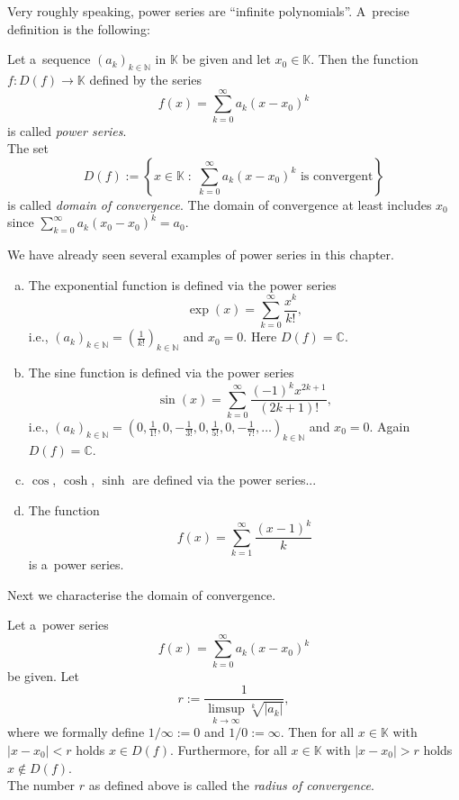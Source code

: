 

Very roughly speaking, power series are ``infinite polynomials''. A~precise definition is the following:
\begin{Definition}{}
Let a~sequence $(a_k)_{k\in\mathbb{N}}$ in $\mathbb{K}$ be given and let $x_0\in\mathbb{K}$. Then the function $f:D(f)\to\mathbb{K}$ defined by the series
\[f(x)=\sum_{k=0}^\infty a_k(x-x_0)^k\]
is called \emph{power series}.\\
The set
\[D(f):=\left\{x\in\mathbb{K}\;:\;\sum_{k=0}^\infty a_k(x-x_{0})^k\text{ is convergent}\right\}\]
is called \emph{domain of convergence}.  The domain of convergence at least includes $x_{0}$ since $\sum_{k=0}^\infty a_k(x_{0}-x_{0})^k=a_{0}$.
\end{Definition}
We have already seen several examples of power series in this chapter.
\begin{example}\label{ex:powser}
\begin{enumerate}[a)]
\item The exponential function is defined via the power series
\[\exp(x)=\sum_{k=0}^\infty\frac{x^k}{k!},\]
i.e., $(a_k)_{k\in\mathbb{N}}=(\frac{1}{k!})_{k\in\mathbb{N}}$ and $x_0=0$. Here $D(f)=\mathbb{C}$.
\item The sine function is defined via the power series
\[\sin(x)=\sum_{k=0}^\infty\frac{(-1)^kx^{2k+1}}{(2k+1)!},\]
i.e., $(a_k)_{k\in\mathbb{N}}=(0,\frac{1}{1!},0,-\frac{1}{3!},0,\frac{1}{5!},0,-\frac{1}{7!},\ldots)_{k\in\mathbb{N}}$ and $x_0=0$.
Again $D(f)=\mathbb{C}$.
\item $\cos$, $\cosh$, $\sinh$ are defined via the power series...
\item The function
\[f(x)=\sum_{k=1}^\infty\frac{(x-1)^k}{k}\]
is a~power series.
\end{enumerate}
\end{example}

Next we characterise the domain of convergence.
\begin{Theorem}
Let a~power series
\[f(x)=\sum_{k=0}^\infty a_k(x-x_0)^k\]
be given. Let
\[r:=\frac1{\limsup\limits_{k \rightarrow \infty} \sqrt[k]{|a_k|}},\]
where we formally define $1/\infty:=0$ and $1/0:=\infty$. Then for all $x\in\mathbb{K}$ with $|x-x_0|<r$ holds $x\in D(f)$. Furthermore,
for all $x\in\mathbb{K}$ with $|x-x_0|>r$ holds $x\notin D(f)$.\\
The number $r$ as defined above is called the {\em radius of convergence}.
\end{Theorem}

